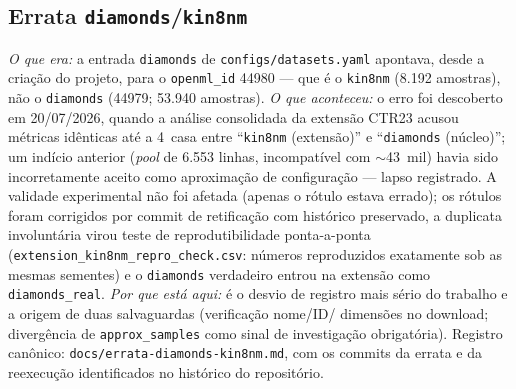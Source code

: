\subsection{Errata \texttt{diamonds}/\texttt{kin8nm}}
\emph{O que era:} a entrada \texttt{diamonds} de
\texttt{configs/\allowbreak datasets.\allowbreak yaml} apontava, desde a criação do projeto,
para o \texttt{openml\_id} 44980 --- que é o \texttt{kin8nm} (8.192
amostras), não o \texttt{diamonds} (44979; 53.940 amostras).
\emph{O que aconteceu:} o erro foi descoberto em 20/07/2026, quando a
análise consolidada da extensão CTR23 acusou métricas idênticas até a
4\textordfeminine\ casa entre ``\texttt{kin8nm} (extensão)'' e ``\texttt{diamonds}
(núcleo)''; um indício anterior (\emph{pool} de 6.553 linhas, incompatível
com $\sim$43~mil) havia sido incorretamente aceito como aproximação de
configuração --- lapso registrado. A validade experimental não foi
afetada (apenas o rótulo estava errado); os rótulos foram corrigidos
por commit de retificação com histórico preservado, a duplicata
involuntária virou teste de reprodutibilidade ponta-a-ponta
(\texttt{extension\_\allowbreak kin8nm\_\allowbreak repro\_\allowbreak check.\allowbreak csv}: números reproduzidos
exatamente sob as mesmas sementes) e o \texttt{diamonds} verdadeiro
entrou na extensão como \texttt{diamonds\_real}. \emph{Por que está
aqui:} é o desvio de registro mais sério do trabalho e a origem de
duas salvaguardas (verificação nome\slash ID\slash %
dimensões no download; divergência de \texttt{approx\_\allowbreak samples} como
sinal de investigação obrigatória). Registro canônico:
\texttt{docs/\allowbreak errata-\allowbreak diamonds-\allowbreak kin8nm.\allowbreak md},
com os commits da errata e da reexecução identificados no histórico do
repositório.

